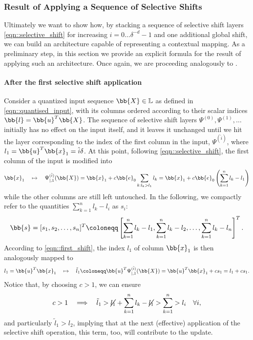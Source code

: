 \subsubsection{Result of Applying a Sequence of Selective Shifts}
\label{sec::action_of_building_blocks}
Ultimately we want to show how, by stacking a sequence of selective shift layers \cref{eqn::selective_shift} for increasing $i=0\dots\delta^{-d}-1$ and one additional global shift, we can build an architecture capable of representing a contextual mapping. As a preliminary step, in this section we provide an explicit formula for the result of applying such an architecture. Once again, we are proceeding analogously to \citet[App.~B.5.1]{Yun_UAP}.

\paragraph{After the first selective shift application} Consider a quantized input sequence $\bb{X}\in\mathbb{L}$ as defined in \cref{eqn::quantised_input}, with its columns ordered according to their scalar indices $\bb{l}=\bb{u}^T\bb{X}$. The sequence of selective shift layers $\Psi^{(0)},\Psi^{(1)},\dots$ initially has no effect on the input itself, and it leaves it unchanged until we hit the layer corresponding to the index of the first column in the input, $\Psi^{(\hat{i})}$, where $l_1=\bb{u}^T\bb{x}_1=\hat{i}\delta$. At this point, following \cref{eqn::selective_shift}, the first column of the input is modified into
\begin{equation}
    \bb{x}_1\quad\mapsto\quad\Psi^{(\hat{i})}_{|,1}(\bb{X})
    =\bb{x}_1+ c\bb{e}_0\sum_{k:l_k>l_1}l_k
    =\bb{x}_1+ c\bb{e}_0\left(\sum_{k=1}^{n}l_k - l_1\right)
    \label{eqn::first_shift}
\end{equation}
while the other columns are still left untouched. In the following, we compactly refer to the quantities $\sum_{k=1}^{n}l_k - l_i$ as $s_i$:
\begin{equation}
    \bb{s} = [s_1,s_2,\dots,s_n]^T \coloneqq \left[\sum_{k=1}^{n}l_k - l_1, \sum_{k=1}^{n}l_k - l_2,\dots,\sum_{k=1}^{n}l_k - l_n\right]^T.
    \label{eqn::partial_sum}
\end{equation}
According to \cref{eqn::first_shift}, the index $l_1$ of column $\bb{x}_1$ is then analogously mapped to
\begin{equation}
    l_1=\bb{u}^T\bb{x}_1\quad\mapsto\quad\tilde{l}_1\coloneqq\bb{u}^T\Psi^{(\hat{i})}_{|,1}(\bb{X})
    =\bb{u}^T\bb{x}_1+ cs_1 = l_1 + cs_1.
    \label{eqn::tildel1}
\end{equation}
Notice that, by choosing $c>1$, we can ensure
\begin{equation}
    c>1\quad\Longrightarrow\quad\tilde{l}_1>\cancel{l_1} + \sum_{k=1}^{n}l_k-\cancel{l_1} > \sum_{k=1}^{n} > l_i\quad\forall i,
    \label{eqn::tildel1_is_larger}
\end{equation}
and particularly $\tilde{l}_1>l_2$, implying that at the next (effective) application of the selective shift operation, this term, too, will contribute to the update.

